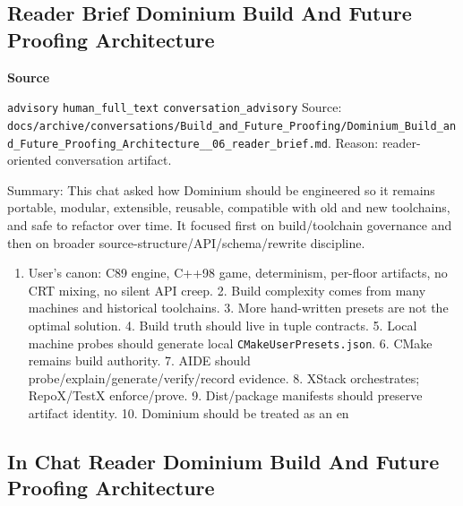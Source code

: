 \documentclass[9pt,a4paper,openany]{book}
\newcommand{\vonecallout}[3]{\par\medskip\noindent\begingroup\setlength{\fboxsep}{7pt}\colorbox{DomCalloutBg}{\parbox{0.94\linewidth}{\textbf{\textcolor{#1}{#2}}\par #3}}\endgroup\par\medskip}
\begin{document}
\subsection{Reader Brief Dominium Build And Future Proofing Architecture}

\vonecallout{DomSlate}{Source}{\texttt{advisory} \texttt{human\_\allowbreak{}full\_\allowbreak{}text} \texttt{conversation\_\allowbreak{}advisory} Source: \texttt{docs/\allowbreak{}archive/\allowbreak{}conversations/\allowbreak{}Build\_\allowbreak{}and\_\allowbreak{}Future\_\allowbreak{}Proofing/\allowbreak{}Dominium\_\allowbreak{}Build\_\allowbreak{}and\_\allowbreak{}Future\_\allowbreak{}Proofing\_\allowbreak{}Architecture\_\allowbreak{}\_\allowbreak{}06\_\allowbreak{}reader\_\allowbreak{}brief.\allowbreak{}md}.\allowbreak{} Reason: reader-\allowbreak{}oriented conversation artifact.\allowbreak{}}

Summary: This chat asked how Dominium should be engineered so it remains portable, modular, extensible, reusable, compatible with old and new toolchains, and safe to refactor over time.\allowbreak{} It focused first on build/\allowbreak{}toolchain governance and then on broader source-\allowbreak{}structure/\allowbreak{}API/\allowbreak{}schema/\allowbreak{}rewrite discipline.\allowbreak{}


\begin{enumerate}
\item User's canon: C89 engine, C++98 game, determinism, per-\allowbreak{}floor artifacts, no CRT mixing, no silent API creep.\allowbreak{} 2.\allowbreak{} Build complexity comes from many machines and historical toolchains.\allowbreak{} 3.\allowbreak{} More hand-\allowbreak{}written presets are not the optimal solution.\allowbreak{} 4.\allowbreak{} Build truth should live in tuple contracts.\allowbreak{} 5.\allowbreak{} Local machine probes should generate local \texttt{CMakeUserPresets.\allowbreak{}json}.\allowbreak{} 6.\allowbreak{} CMake remains build authority.\allowbreak{} 7.\allowbreak{} AIDE should probe/\allowbreak{}explain/\allowbreak{}generate/\allowbreak{}verify/\allowbreak{}record evidence.\allowbreak{} 8.\allowbreak{} XStack orchestrates; RepoX/\allowbreak{}TestX enforce/\allowbreak{}prove.\allowbreak{} 9.\allowbreak{} Dist/\allowbreak{}package manifests should preserve artifact identity.\allowbreak{} 10.\allowbreak{} Dominium should be treated as an en
\end{enumerate}


\subsection{In Chat Reader Dominium Build And Future Proofing Architecture}
\end{document}
